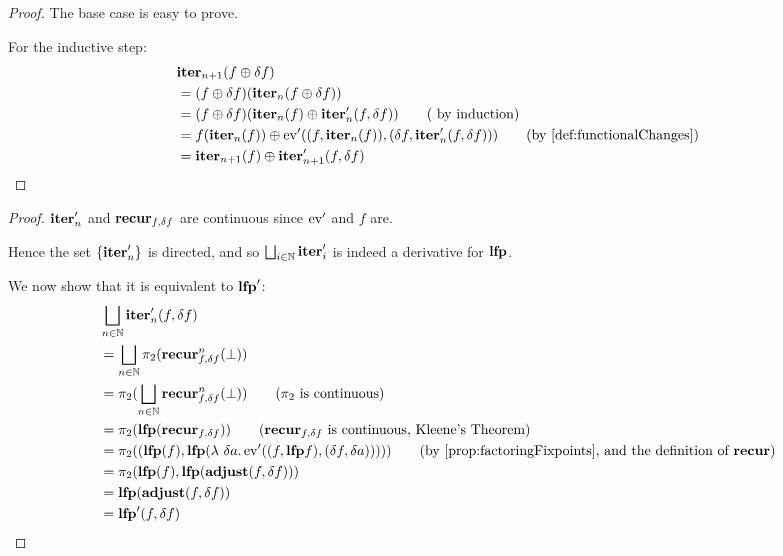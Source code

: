 \iterDerivativesF*
\begin{proof}
  \label{prf:iterDerivativesF}
  The base case is easy to prove.

  For the inductive step:
  \begin{align*}
    &\iter_{n+1}(f \cplus \change{f})\\
    &=(f \cplus \change{f})(\iter_{n}(f \cplus \change{f}))\\
    &= (f \cplus \change{f})(
        \iter_{n}(f)
        \cplus \derive{\iter_{n}}(f, \change{f})
      )
    \tag{ by induction}\\
    &= f(\iter_n(f)) \cplus \derive{\ev}((f, \iter_{n}(f)), (\change{f},
      \derive{\iter_{n}}(f, \change{f})))
    \tag{by \cref{def:functionalChanges}}\\
    & =\iter_{n+1}(f) \cplus \derive{\iter_{n+1}}(f, \change{f})
  \end{align*}
\end{proof}

\leastFixpointDerivatives*
\begin{proof}
  \label{prf:leastFixpointDerivatives}
  $\mathbf{iter}_n'$ and $\mathbf{recur}_{f, \delta f}$ are continuous since
  $\operatorname{ev}'$ and $f$ are.

  Hence the set $\{ \mathbf{iter}'_n \}$ is directed, and so $\bigsqcup_{i \in \mathbb{N}}
  \mathbf{iter}_i'$ is indeed a derivative for $\mathbf{lfp}$.

  We now show that it is equivalent to $\mathbf{lfp}'$:
  \begin{align*}
    &\bigsqcup_{n \in \NN} \derive{\iter_n}(f, \change{f})\\
    &=\bigsqcup_{n \in \NN} \pi_2(\nextiter_{f, \change{f}}^n(\bot))\\
    &=\pi_2(\bigsqcup_{n \in \NN} \nextiter_{f, \change{f}}^n(\bot)) \tag{$\pi_2$ is continuous}\\
    &= \pi_2 (\lfp(\nextiter_{f, \change{f}})) \tag{$\nextiter_{f, \change{f}}$ is continuous, Kleene's Theorem}\\
    &= \pi_2 ((\lfp(f), \lfp (\lambda\ \change{a}. \derive{\ev}((f, \lfp f), (\change{f}, \change{a})))))
    \tag{by \cref{prop:factoringFixpoints}, and the definition of $\nextiter$}\\
    &= \pi_2 (\lfp(f), \lfp(\adjust(f, \change{f})))\\
    &= \lfp(\adjust(f, \change{f}))\\
    &= \derive{\lfp}(f, \change{f})
  \end{align*}
\end{proof}

